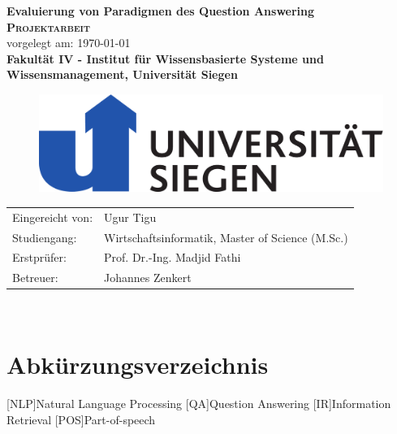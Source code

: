 \documentclass[
        ngerman,
        paper=a4,
        numbers=noendperiod,
]{scrreprt}
\begin{document}
\begin{titlepage}
    \begin{center}
    \huge \textbf{\textsf{Evaluierung von Paradigmen des Question Answering}} \\
    \vspace{1cm}
    \LARGE\textbf{\textsc{Projektarbeit }}\\
    \vspace{1cm}
    \normalsize
    vorgelegt am: \today \\
    \vspace{2.5cm}
    \large \textbf{Fakultät IV - 
Institut für Wissensbasierte
Systeme und Wissensmanagement, Universität Siegen
}
\linebreak
\linebreak
\begin{figure}[H]
    \centering\includegraphics[width=0.4\linewidth]{images/imageuni.pdf}
    \label{fig:Unilabel}
\end{figure}
    \end{center}
    \vspace{3cm}
    \begin{center}
 \normalsize{
    \begin{tabular}{ll}
    	Eingereicht von: & {Ugur Tigu} \\
    	Studiengang: & Wirtschaftsinformatik, Master of Science (M.Sc.)\\
	Erstprüfer: & Prof. Dr.-Ing. Madjid Fathi \\
	Betreuer: &   Johannes Zenkert\\
    \end{tabular}\\
    }
\end{center}
\end{titlepage}
\setcounter{page}{0}
\tableofcontents
\clearpage 
{}
\listoffigures
\clearpage 
{}
\listoftables
\clearpage 
\chapter*{Abkürzungsverzeichnis}
\begin{acronym}

[NLP]{Natural Language Processing}
[QA]{Question Answering}
[IR]{Information Retrieval}
[POS]{Part-of-speech}

\end{acronym}
\clearpage 
{} 
\listofxequations
\clearpage
\setcounter{page}{1}
\end{document}
